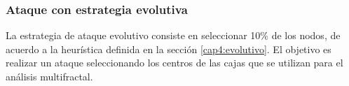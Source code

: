 \subsubsection{Ataque con estrategia evolutiva}

La estrategia de ataque evolutivo consiste en seleccionar 10\% de los nodos, de acuerdo a la heurística definida en la sección \ref{cap4:evolutivo}. El objetivo es realizar un ataque seleccionando los centros de las cajas que se utilizan para el análisis multifractal.